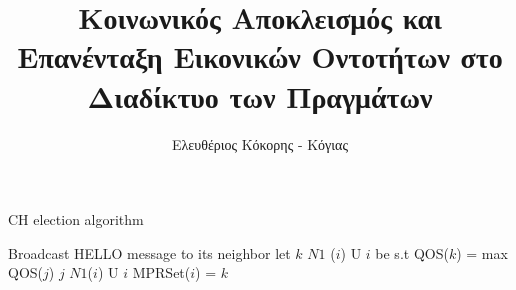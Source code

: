 \documentclass[diploma]{softlab-thesis}
\begin{document}

\frontmatter

\title{Κοινωνικός Αποκλεισμός και Επανένταξη Εικονικών Οντοτήτων στο Διαδίκτυο των Πραγμάτων} 

\author{Ελευθέριος Κόκορης - Κόγιας}


\maketitle
\def\templen{\parindent}
\setlength{\parindent}{0pt}
\setlength{\parskip}{2.0ex plus 0.5ex minus 0.2ex}
\begin{large}



\setlength{\parindent}{\templen}
\setlength{\parskip}{0pt}
\tableofcontents
\listoffigures
\listoftables
\renewcommand{\lstlistlistingname}{Κατάλογος Κώδικα}
\lstlistoflistings %

\mainmatter
\setlength{\parindent}{0pt}
\setlength{\parskip}{2.0ex plus 0.5ex minus 0.2ex}

\renewcommand\floatpagefraction{.7}





\begin{algorithm}
\caption{CH election algorithm}
\label{CHalgorithm}
\begin{algorithmic}[1]
\State Broadcast HELLO message to its neighbor
\State let $k$  $N1$ ($i$) U {$i$} be s.t
\State QOS($k$) = max {QOS($j$) \textbar $j$  $N1$($i$)  U $i$}
\State MPRSet($i$) = $k$
\EndFor
\EndProcedure
\end{algorithmic}
\end{algorithm}

\end{large}
\end{document}
